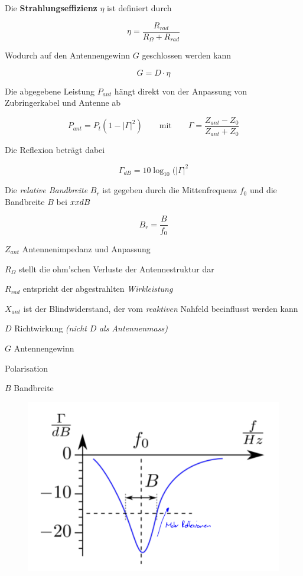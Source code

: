 \documentclass[
  10pt,
  a4paper,
  german]{article}
\numberwithin{equation}{section}
\begin{document}
\begin{multicols}{2}

Die \textbf{Strahlungseffizienz} \(\eta\) ist definiert durch

\[
\eta=\frac{R_{rad}}{R_\Omega+R_{rad}}
\]

Wodurch auf den Antennengewinn \(G\) geschlossen werden kann

\[
G=D\cdot\eta
\]

Die abgegebene Leistung \(P_{ant}\) hängt direkt von der Anpassung von
Zubringerkabel und Antenne ab

\[
P_{ant}=P_t(1-|\Gamma|^2)\qquad\text{mit}\qquad\Gamma=\frac{Z_{ant}-Z_0}{Z_{ant}+Z_0}
\]

Die Reflexion beträgt dabei

\[
\Gamma_{dB}=10\log_{10}{(|\Gamma|^2}
\]

Die \emph{relative Bandbreite} \(B_r\) ist gegeben durch die
Mittenfrequenz \(f_0\) und die Bandbreite \(B\) bei \(xx\space dB\)

\[
B_r=\frac{B}{f_0}
\]

\columnbreak

\(Z_{ant}\) Antennenimpedanz und Anpassung

\(R_\Omega\) stellt die ohm'schen Verluste der Antennestruktur dar

\(R_{rad}\) entspricht der abgestrahlten \emph{Wirkleistung}

\(X_{ant}\) ist der Blindwiderstand, der vom \emph{reaktiven} Nahfeld
beeinflusst werden kann

\(D\) Richtwirkung \emph{(nicht} \(D\) \emph{als Antennenmass)}

\(G\) Antennengewinn

Polarisation

\(B\) Bandbreite

\end{multicols}

\begin{figure}[H]

{\centering \includegraphics{images/04_RelativeBandbreite.png}

}

\end{figure}
\end{document}
